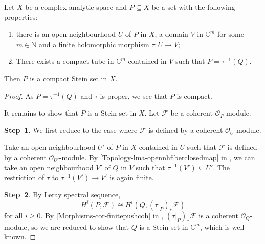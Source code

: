 \begin{thm}\label{thm-blocktostein}
    Let $X$ be a complex analytic space and $P\subseteq X$ be a set with the following properties:
    \begin{enumerate}
        \item there is an open neighbourhood $U$ of $P$ in $X$, a domain $V$ in $\mathbb{C}^m$ for some $m\in \mathbb{N}$ and a finite holomorphic morphism $\tau:U\rightarrow V$;
        \item There exists a compact tube in $\mathbb{C}^m$ contained in $V$ such that $P=\tau^{-1}(Q)$.
    \end{enumerate}
    Then $P$ is a compact Stein set in $X$.
\end{thm}
\begin{proof}
    As $P=\tau^{-1}(Q)$ and $\tau$ is proper, we see that $P$ is compact.
    
    It remains to show that $P$ is a Stein set in $X$. Let $\mathcal{F}$ be a coherent $\mathcal{O}_P$-module.

    \textbf{Step~1}. We first reduce to the case where $\mathcal{F}$ is defined by a coherent $\mathcal{O}_U$-module.

    Take an open neighbourhood $U'$ of $P$ in $X$ contained in $U$ such that $\mathcal{F}$ is defined by a coherent $\mathcal{O}_{U'}$-module. By \cref{Topology-lma-opennhfiberclosedmap} in , we can take an open neighbourhood $V'$ of $Q$ in $V$ such that $\tau^{-1}(V')\subseteq U'$. The restriction of $\tau$ to $\tau^{-1}(V')\rightarrow V'$ is again finite.

    \textbf{Step~2}. By Leray spectral sequence,
    \[
        H^i(P,\mathcal{F})\cong H^i(Q,(\tau|_P)_*\mathcal{F})
    \]
    for all $i\geq 0$. By \cref{Morphisms-cor-finitepushcoh}  in , $(\tau|_P)_*\mathcal{F}$ is a coherent $\mathcal{O}_Q$-module, so we are reduced to show that $Q$ is a Stein set in $\mathbb{C}^m$, which is well-known.
\end{proof}




